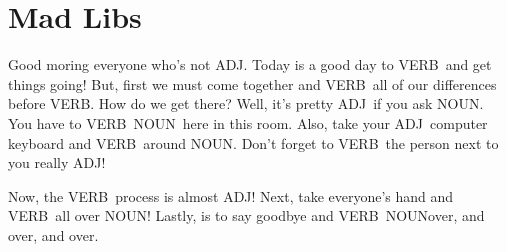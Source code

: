 \documentclass[]{article}
\newcommand{\verbOne}{VERB}
\newcommand{\verbTwo}{VERB}
\newcommand{\verbThree}{VERB}
\newcommand{\verbFour}{VERB}
\newcommand{\verbFive}{VERB}
\newcommand{\verbSix}{VERB}
\newcommand{\nounTwo}{NOUN}
\newcommand{\nounThree}{NOUN}
\newcommand{\nounFour}{NOUN}
\newcommand{\nounFive}{NOUN}
\newcommand{\adjOne}{ADJ}
\newcommand{\adjTwo}{ADJ}
\newcommand{\adjThree}{ADJ}
\newcommand{\adjFive}{ADJ}
\begin{document}
\section{Mad Libs}

Good moring everyone who's not \adjOne.
Today is a good day to \verbOne~and get things going!
But, first we must come together and \verbTwo~all of our differences before \verbThree.
How do we get there?
Well, it's pretty \adjTwo~if you ask \nounTwo.
You have to \verbFour~\nounTwo~here in this room.
Also, take your \adjFive~computer keyboard and \verbFive~around \nounThree.
Don't forget to \verbFour~the person next to you really \adjThree!

Now, the \verbOne~process is almost \adjTwo!
Next, take everyone's hand and \verbSix~all over \nounFour!
Lastly, is to say goodbye and \verbThree~\nounFive over, and over, and over.
\end{document}
